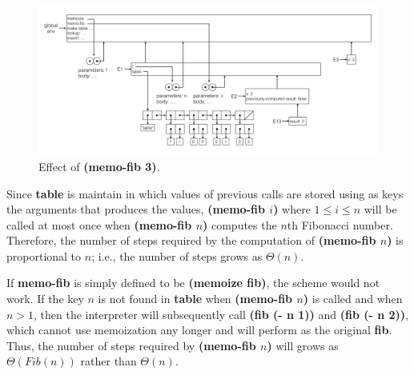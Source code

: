 \documentclass[11pt, oneside]{article}
\begin{document}
\begin{figure}[h!]
    \centering\includegraphics[width=15cm]{ex-3.27-6.png}
    \caption{Effect of \textbf{(memo-fib 3)}.}
\end{figure}

Since \textbf{table} is maintain in which values of previous calls are stored using as keys the arguments that produces the values, \textbf{(memo-fib $i$)} where $1 \leq i \leq n$ will be called at most once when \textbf{(memo-fib $n$)} computes the $n$th Fibonacci number. Therefore, the number of steps required by the computation of \textbf{(memo-fib $n$)} is proportional to $n$; i.e., the number of steps grows as $\Theta(n)$.

If \textbf{memo-fib} is simply defined to be \textbf{(memoize fib)}, the scheme would not work. If the key $n$ is not found in \textbf{table} when \textbf{(memo-fib $n$)} is called and when $n > 1$, then the interpreter will subsequently call \textbf{(fib (- n 1))} and \textbf{(fib (- n 2))}, which cannot use memoization any longer and will perform as the original \textbf{fib}. Thus, the number of steps required by \textbf{(memo-fib $n$)} will grows as $\Theta(Fib(n))$ rather than $\Theta(n)$.
\end{document}
